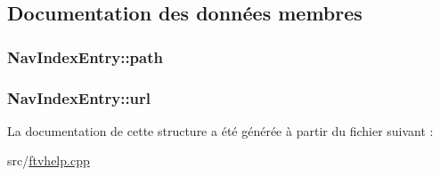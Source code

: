 \subsection{Documentation des données membres}
\hypertarget{struct_nav_index_entry_a684ba0c749048aa18f5e29f8ba820d7f}{}
\subsubsection[{path}]{ Nav\+Index\+Entry\+::path}\label{struct_nav_index_entry_a684ba0c749048aa18f5e29f8ba820d7f}
\hypertarget{struct_nav_index_entry_a27809e7b238b92e5aafafd1a57900111}{}
\subsubsection[{url}]{ Nav\+Index\+Entry\+::url}\label{struct_nav_index_entry_a27809e7b238b92e5aafafd1a57900111}


La documentation de cette structure a été générée à partir du fichier suivant \+:\begin{DoxyCompactItemize}
\item 
src/\hyperlink{ftvhelp_8cpp}{ftvhelp.\+cpp}\end{DoxyCompactItemize}
